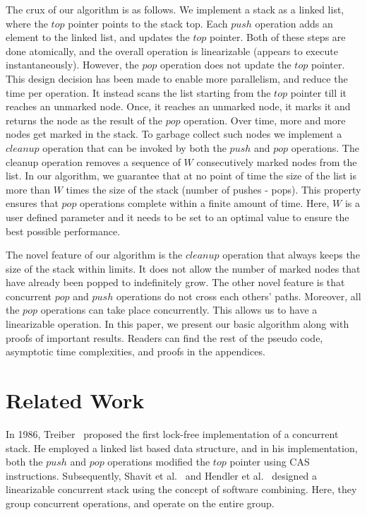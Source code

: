 \documentclass{llncs}
\begin{document}
The crux of our algorithm is as follows. We implement a stack as a linked list, where the $top$ pointer
points to the stack top. Each $push$ operation adds an element to the linked list, and updates the $top$ pointer.
Both of these steps are done atomically, and the overall operation is linearizable (appears
to execute instantaneously). However, the $pop$ 
operation does not update the $top$ pointer. This design decision has been made to enable more parallelism,
and reduce the time per operation. It instead scans the list starting from the $top$ pointer till
it reaches an unmarked node. Once, it reaches an unmarked node, it marks it and returns the node as the result
of the $pop$ operation. Over time, more and more nodes get marked in the stack. To garbage collect such
nodes we implement a $cleanup$ operation that can be invoked by both the $push$ and $pop$ operations.
The cleanup operation removes a sequence of $W$ consecutively marked nodes from the list. In our algorithm,
we guarantee that at no point of time the size of the list is more than $W$ times the size of the stack
(number of pushes - pops). This property ensures that $pop$ operations complete within a finite amount of
time. Here, $W$ is a user defined parameter and it needs to be set to an optimal value to ensure the best
possible performance. 

The novel feature of our algorithm is the $cleanup$ operation that always keeps the size of the stack
within limits. It does not allow the number of marked nodes that have already been popped to indefinitely
grow. The other novel feature is that concurrent $pop$ and $push$ operations do not cross each others' paths. 
Moreover, all the $pop$ operations can take place concurrently. This allows us to have a linearizable operation. 
In this paper, we present our basic algorithm along with proofs of important results. Readers can find
the rest of the pseudo code, asymptotic time complexities, and proofs in the appendices. 

\section{Related Work}
\label{sec:rel}
\vspace{-2mm}
In 1986, Treiber~\cite{CopingWithPara} proposed the first lock-free
implementation of a concurrent stack.  He employed a linked list based data
structure, and in his implementation, both the $push$ and $pop$
operations modified the $top$ pointer using CAS instructions.  
Subsequently, Shavit et
al.~\cite{combiningFunnels} and Hendler et al.~\cite{flatCombining} designed a
linearizable concurrent stack using the concept of software combining. Here,
they group concurrent operations, and operate on the entire group.
\end{document}
